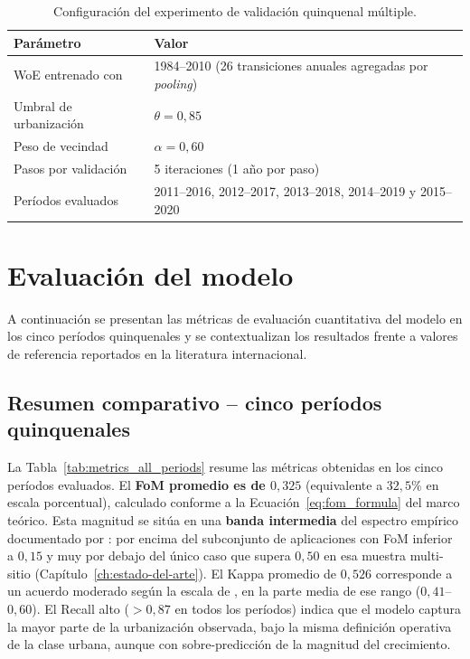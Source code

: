 \begin{table}[htbp]
\centering
\caption{Configuración del experimento de validación quinquenal múltiple.}
\label{tab:simulation_config}
\begin{tabular}{ll}
\toprule
\textbf{Parámetro} & \textbf{Valor} \\
\midrule
WoE entrenado con & 1984--2010 (26 transiciones anuales agregadas por \textit{pooling}) \\
Umbral de urbanización & $\theta = 0{,}85$ \\
Peso de vecindad & $\alpha = 0{,}60$ \\
Pasos por validación & 5 iteraciones (1 año por paso) \\
Períodos evaluados & 2011--2016, 2012--2017, 2013--2018, 2014--2019 y 2015--2020 \\
\bottomrule
\end{tabular}
\end{table}

\section{Evaluación del modelo}
\label{sec:evaluacion}

A continuación se presentan las métricas de evaluación cuantitativa del modelo en los cinco períodos quinquenales y se contextualizan los resultados frente a valores de referencia reportados en la literatura internacional.

\subsection{Resumen comparativo -- cinco períodos quinquenales}

La Tabla~\ref{tab:metrics_all_periods} resume las métricas obtenidas en los cinco períodos evaluados. El \textbf{FoM promedio es de $0{,}325$} (equivalente a $32{,}5\%$ en escala porcentual), calculado conforme a la Ecuación~\ref{eq:fom_formula} del marco teórico. Esta magnitud se sitúa en una \textbf{banda intermedia} del espectro empírico documentado por \textcite{pontius2008comparing}: por encima del subconjunto de aplicaciones con FoM inferior a $0{,}15$ y muy por debajo del único caso que supera $0{,}50$ en esa muestra multi-sitio (Capítulo~\ref{ch:estado-del-arte}). El Kappa promedio de $0{,}526$ corresponde a un acuerdo moderado según la escala de \textcite{LandisKoch1977}, en la parte media de ese rango ($0{,}41$--$0{,}60$). El Recall alto ($>0{,}87$ en todos los períodos) indica que el modelo captura la mayor parte de la urbanización observada, bajo la misma definición operativa de la clase urbana, aunque con sobre-predicción de la magnitud del crecimiento.

